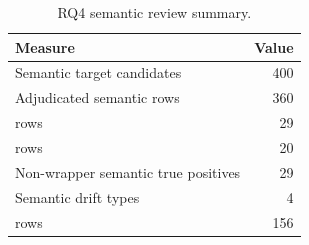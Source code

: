 \begin{table}[t]
\centering
\caption{RQ4 semantic review summary.}
\label{tab:rq4-semantic-review}
\begin{tabular}{lr}
\toprule
Measure & Value \\
\midrule
Semantic target candidates & 400 \\
Adjudicated semantic rows & 360 \\
\truesemantic{} rows & 29 \\
\truewrapper{} rows & 20 \\
Non-wrapper semantic true positives & 29 \\
Semantic drift types & 4 \\
\falsepositive{} rows & 156 \\
\bottomrule
\end{tabular}
\end{table}
